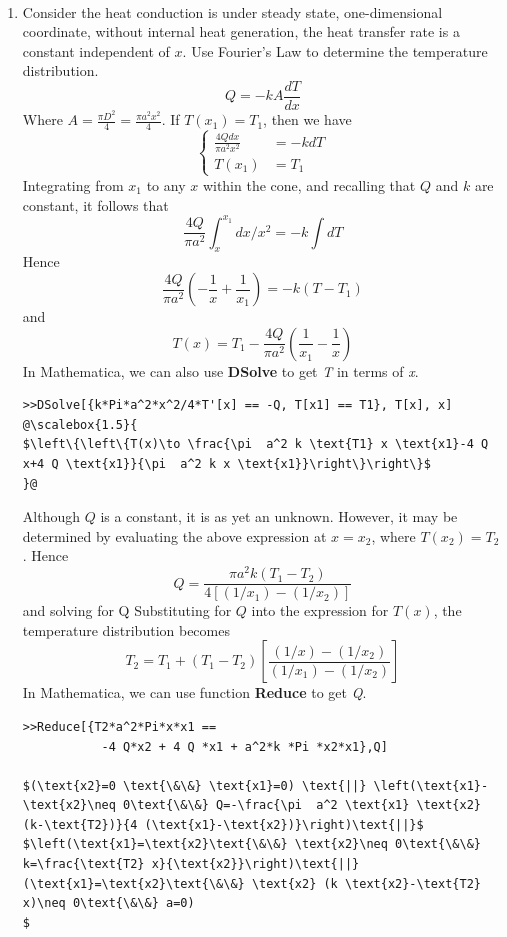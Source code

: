 \begin{solution}
~\\
\begin{enumerate}
\item
Consider the heat conduction is under steady state, one-dimensional coordinate,
without internal heat generation, the heat transfer rate is a constant independent
of $x$. Use Fourier’s Law to determine the temperature distribution.
$$Q=-kA\frac{dT}{dx}$$
Where $A=\frac{\pi D^2}{4}=\frac{\pi a^2x^2}{4}$. If $T(x_1)=T_1$, then we have
\begin{equation*}
\left\{
\begin{aligned}
 \frac{4Qdx}{\pi a^2x^2}&=-kdT \\
 T(x_1)&=T_1
\end{aligned}
\right.
\end{equation*}
Integrating from $x_1$ to any $x$ within the cone, and recalling that $Q$ and $k$
are constant, it follows that
$$\frac{4Q}{\pi a^2}\int_x^{x_1} dx/x^2=-k\int dT$$
Hence
$$\frac{4Q}{\pi a^2}\left(-\frac{1}{x}+\frac{1}{x_1}\right)=-k\left(T-T_1\right)$$
and
$$T(x)=T_1-\frac{4Q}{\pi a^2}\left(\frac{1}{x_1}-\frac{1}{x}\right)$$
In Mathematica, we can also use \textbf{DSolve} to get \emph{T} in terms of \emph{x}.
\begin{lstlisting}
>>DSolve[{k*Pi*a^2*x^2/4*T'[x] == -Q, T[x1] == T1}, T[x], x]
@\scalebox{1.5}{
$\left\{\left\{T(x)\to \frac{\pi  a^2 k \text{T1} x \text{x1}-4 Q x+4 Q \text{x1}}{\pi  a^2 k x \text{x1}}\right\}\right\}$
}@
\end{lstlisting}
Although $Q$ is a constant, it is as yet an unknown.
However, it may be determined by evaluating the above expression at
$x=x_2$, where $T(x_2)=T_2$. Hence
$$Q=\frac{\pi a^2k(T_1-T_2)}{4[(1/x_1)-(1/x_2)]}$$
and solving for Q
Substituting for $Q$ into the expression for $T(x)$,
the temperature distribution becomes
$$T_2=T_1+(T_1-T_2)\left[\frac{(1/x)-(1/x_2)}{(1/x_1)-(1/x_2)}
\right]$$
In Mathematica, we can use function \textbf{Reduce} to get \emph{Q}.
\begin{lstlisting}
>>Reduce[{T2*a^2*Pi*x*x1 ==
           -4 Q*x2 + 4 Q *x1 + a^2*k *Pi *x2*x1},Q]
        
$(\text{x2}=0 \text{\&\&} \text{x1}=0) \text{||} \left(\text{x1}-\text{x2}\neq 0\text{\&\&} Q=-\frac{\pi  a^2 \text{x1} \text{x2} (k-\text{T2})}{4 (\text{x1}-\text{x2})}\right)\text{||}$
$\left(\text{x1}=\text{x2}\text{\&\&} \text{x2}\neq 0\text{\&\&} k=\frac{\text{T2} x}{\text{x2}}\right)\text{||} (\text{x1}=\text{x2}\text{\&\&} \text{x2} (k \text{x2}-\text{T2} x)\neq 0\text{\&\&} a=0)
$
\end{lstlisting}


\end{enumerate}
\end{solution}
